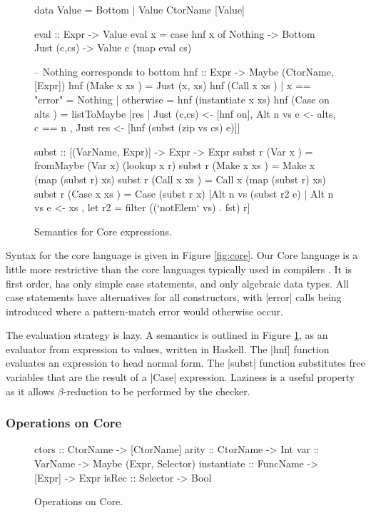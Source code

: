 \begin{figure}
\begin{code}
data Value = Bottom | Value CtorName [Value]

eval :: Expr -> Value
eval x = case  hnf x of
               Nothing      -> Bottom
               Just (c,cs)  -> Value c (map eval cs)

-- Nothing corresponds to bottom
hnf :: Expr -> Maybe (CtorName, [Expr])
hnf (Make  x   xs    )  =  Just (x, xs)
hnf (Call  x   xs    )  |  x == "error"  = Nothing
                        |  otherwise     = hnf (instantiate x xs)
hnf (Case  on  alts  )  =  listToMaybe [res
       |  Just (c,cs) <- [hnf on], Alt n vs e <- alts, c == n
       ,  Just res <- [hnf (subst (zip vs cs) e)]]

subst :: [(VarName, Expr)] -> Expr -> Expr
subst r (Var   x     ) = fromMaybe (Var x) (lookup x r)
subst r (Make  x xs  ) = Make  x (map (subst r) xs)
subst r (Call  x xs  ) = Call  x (map (subst r) xs)
subst r (Case  x xs  ) = Case (subst r x)
    [Alt n vs (subst r2 e) | Alt n vs e <- xs
    , let r2 = filter ((`notElem` vs) . fst) r]
\end{code}
\caption{Semantics for Core expressions.}
\label{fig:semantics}
\end{figure}

Syntax for the core language is given in Figure \ref{fig:core}. Our Core language is a little more restrictive than the core languages typically used in compilers \citep{ghc_core}. It is first order, has only simple case statements, and only algebraic data types. All case statements have alternatives for all constructors, with |error| calls being introduced where a pattern-match error would otherwise occur.

The evaluation strategy is lazy. A semantics is outlined in Figure \ref{fig:semantics}, as an evaluator from expression to values, written in Haskell. The |hnf| function evaluates an expression to head normal form. The |subst| function substitutes free variables that are the result of a |Case| expression. Laziness is a useful property as it allows $\beta$-reduction to be performed by the checker.

\subsubsection{Operations on Core}

\begin{figure}
\begin{code}
ctors        :: CtorName  -> [CtorName]
arity        :: CtorName  -> Int
var          :: VarName   -> Maybe (Expr, Selector)
instantiate  :: FuncName  -> [Expr] -> Expr
isRec        :: Selector  -> Bool
\end{code}
\caption{Operations on Core.}
\label{fig:core_operations}
\end{figure}

